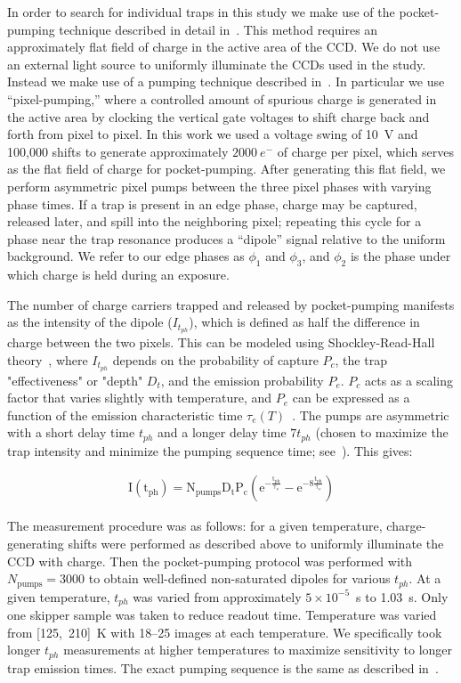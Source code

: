 \documentclass[aps, prapplied,twocolumn,showpacs,superscriptaddress,preprintnumbers, longbibliography,nofootinbib,floatfix]{revtex4-2}
\newcommand{\myrange}[3]{[\num{#1},~\num{#2}]~\unit{#3}}  %
\begin{document}
In order to search for individual traps in this study we make use of the pocket-pumping technique described in detail in~\cite{hall_situ_2017,trapsOscura}.
This method requires an approximately flat field of charge in the active area of the CCD. 
We do not use an external light source to uniformly illuminate the CCDs used in the study. 
Instead we make use of a pumping technique described in~\cite{wu_characterization_2026}. 
In particular we use ``pixel-pumping,'' where a controlled amount of spurious charge is generated in the active area by clocking the vertical gate voltages to shift charge back and forth from pixel to pixel. 
In this work we used a voltage swing of 10~V and 100,000 shifts to generate approximately $2000~e^-$ of charge per pixel, which serves as the flat field of charge for pocket-pumping. 
After generating this flat field, we perform asymmetric pixel pumps between the three pixel phases with varying phase times. 
If a trap is present in an edge phase, charge may be captured, released later, and spill into the neighboring pixel; repeating this cycle for a phase near the trap resonance produces a ``dipole'' signal relative to the uniform background. 
We refer to our edge phases as $\phi_1$ and $\phi_3$, and $\phi_2$ is the phase under which charge is held during an exposure.

The number of charge carriers trapped and released by pocket-pumping manifests as the intensity of the dipole ($I_{t_{ph}}$), which is defined as half the difference in charge between the two pixels. 
This can be modeled using Shockley-Read-Hall theory~\cite{PhysRev.87.835,PhysRev.87.387}, where $I_{t_{ph}}$ depends on the probability of capture $P_c$, the trap "effectiveness" or "depth" $D_t$, and the emission probability $P_e$. $P_c$ acts as a scaling factor that varies slightly with temperature, and $P_e$ can be expressed as a function of the emission characteristic time $\tau_e(T)$~\cite{trapsOscura}. 
The pumps are asymmetric with a short delay time $t_{ph}$ and a longer delay time $7 t_{ph}$ (chosen to maximize the trap intensity and minimize the pumping sequence time; see~\cite{trapsOscura}). This gives:

\begin{align}\label{eq:I_fit}
    \mathrm{I(t_{ph}) =N_{pumps}D_t P_c \left(e^{-\frac{t_{ph}}{\tau_e}}-e^{-8\frac{t_{ph}}{\tau_e}}\right)}
\end{align}


The measurement procedure was as follows: for a given temperature, charge-generating shifts were performed as described above to uniformly illuminate the CCD with charge. 
Then the pocket-pumping protocol was performed with $N_{\text{pumps}}=3000$ to obtain well-defined non-saturated dipoles for various $t_{ph}$. 
At a given temperature, $t_{ph}$ was varied from approximately $5\times 10^{-5}$~s to 1.03~s. 
Only one skipper sample was taken to reduce readout time. 
Temperature was varied from \myrange{125}{210}{\kelvin} with 18--25 images at each temperature. 
We specifically took longer $t_{ph}$ measurements at higher temperatures to maximize sensitivity to longer trap emission times. 
The exact pumping sequence is the same as described in~\cite{Brusco:2025kus}.
\end{document}
